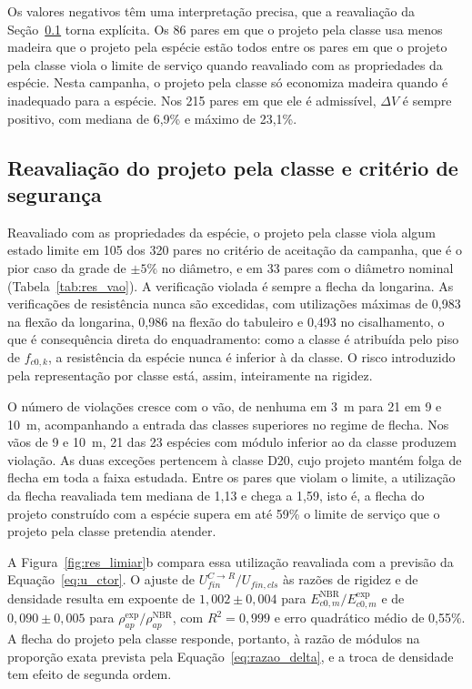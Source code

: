

Os valores negativos têm uma interpretação precisa, que a reavaliação da Seção~\ref{sec:res_seguranca} torna explícita. Os 86 pares em que o projeto pela classe usa menos madeira que o projeto pela espécie estão todos entre os pares em que o projeto pela classe viola o limite de serviço quando reavaliado com as propriedades da espécie. Nesta campanha, o projeto pela classe só economiza madeira quando é inadequado para a espécie. Nos 215 pares em que ele é admissível, $\Delta V$ é sempre positivo, com mediana de 6,9\% e máximo de 23,1\%.

\subsection{Reavaliação do projeto pela classe e critério de segurança}\label{sec:res_seguranca}

Reavaliado com as propriedades da espécie, o projeto pela classe viola algum estado limite em 105 dos 320 pares no critério de aceitação da campanha, que é o pior caso da grade de $\pm5\%$ no diâmetro, e em 33 pares com o diâmetro nominal (Tabela~\ref{tab:res_vao}). A verificação violada é sempre a flecha da longarina. As verificações de resistência nunca são excedidas, com utilizações máximas de 0,983 na flexão da longarina, 0,986 na flexão do tabuleiro e 0,493 no cisalhamento, o que é consequência direta do enquadramento: como a classe é atribuída pelo piso de $f_{c0,k}$, a resistência da espécie nunca é inferior à da classe. O risco introduzido pela representação por classe está, assim, inteiramente na rigidez.

O número de violações cresce com o vão, de nenhuma em 3~m para 21 em 9 e 10~m, acompanhando a entrada das classes superiores no regime de flecha. Nos vãos de 9 e 10~m, 21 das 23 espécies com módulo inferior ao da classe produzem violação. As duas exceções pertencem à classe D20, cujo projeto mantém folga de flecha em toda a faixa estudada. Entre os pares que violam o limite, a utilização da flecha reavaliada tem mediana de 1,13 e chega a 1,59, isto é, a flecha do projeto construído com a espécie supera em até 59\% o limite de serviço que o projeto pela classe pretendia atender.

A Figura~\ref{fig:res_limiar}b compara essa utilização reavaliada com a previsão da Equação~\eqref{eq:u_ctor}. O ajuste de $U_{fin}^{C\rightarrow R}/U_{fin,cls}$ às razões de rigidez e de densidade resulta em expoente de $1{,}002\pm0{,}004$ para $E_{c0,m}^{\mathrm{NBR}}/E_{c0,m}^{\mathrm{exp}}$ e de $0{,}090\pm0{,}005$ para $\rho_{ap}^{\mathrm{exp}}/\rho_{ap}^{\mathrm{NBR}}$, com $R^2=0{,}999$ e erro quadrático médio de 0,55\%. A flecha do projeto pela classe responde, portanto, à razão de módulos na proporção exata prevista pela Equação~\eqref{eq:razao_delta}, e a troca de densidade tem efeito de segunda ordem.

